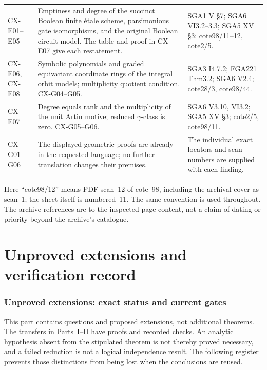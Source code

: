 \documentclass[11pt,a4paper]{article}
\begin{document}
\begin{longtable}{@{}p{}p{}p{}@{}}
CX-E01--E05 & Emptiness and degree of the succinct Boolean finite étale scheme, parsimonious gate isomorphisms, and the original Boolean circuit model. The table and proof in CX-E07 give each restatement. & SGA1 V \S7; SGA6 VI3.2--3.3; SGA5 XV \S3; cote98/11--12, cote2/5.\\
CX-E06, CX-E08 & Symbolic polynomials and graded equivariant coordinate rings of the integral orbit models; multiplicity quotient condition. CX-G04--G05. & SGA3 I4.7.2; FGA221 Thm3.2; SGA6 V2.4; cote28/3, cote98/44.\\
CX-E07 & Degree equals rank and the multiplicity of the unit Artin motive; reduced $\gamma$-class is zero. CX-G05--G06. & SGA6 V3.10, VI3.2; SGA5 XV \S3; cote2/5, cote98/11.\\
CX-G01--G06 & The displayed geometric proofs are already in the requested language; no further translation changes their premises. & The individual exact locators and scan numbers are supplied with each finding.\\
\bottomrule
\end{longtable}

Here ``cote98/12'' means PDF scan~12 of cote~98, including the archival
cover as scan~1; the sheet itself is numbered~11.  The same convention is
used throughout.  The archive references are to the inspected page content,
not a claim of dating or priority beyond the archive's catalogue.


\clearpage\part{Unproved extensions and verification record}

\section{Unproved extensions: exact status and current gates}
\label{sec:unproved}

This part contains questions and proposed extensions, not additional
theorems. The transfers in Parts~I--II have proofs and recorded checks.
An analytic hypothesis absent from the stipulated theorem is not thereby
proved necessary, and a failed reduction is not a logical independence
result. The following register prevents those distinctions from being
lost when the conclusions are reused.
\end{document}

